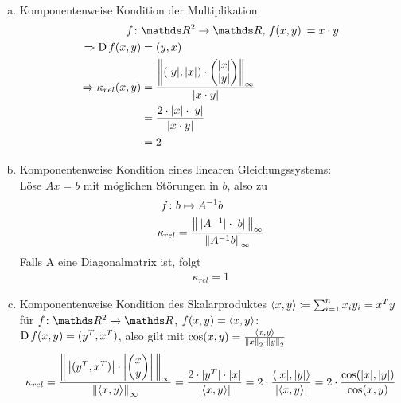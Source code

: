 \begin{Bspe}~
  \begin{enumerate}[a)]
  \item Komponentenweise Kondition der Multiplikation
    \begin{align*}
      f\colon &\R^2 \rightarrow \R, \, f(x,y) \coloneqq x\cdot y \\
      \Rightarrow \D f(x,y) &= (y, x)  \\
      \Rightarrow \kappa_{rel}(x,y) 
              &= \frac{\left\| (|y|, |x|)
                \cdot \begin{pmatrix}
                  |x| \\
                  |y|
                \end{pmatrix}\right\|_\infty}{|x\cdot y|} \\
              &= \frac{2\cdot|x|\cdot |y|}{|x\cdot y|} \\
              &= 2
    \end{align*}
  \item Komponentenweise Kondition eines linearen Gleichungssystems:\\
    Löse $Ax=b$ mit möglichen Störungen in $b$, also zu
    \begin{align*}
      f\colon & b\mapsto A^{-1}b \\
      \kappa_{rel} & = \frac{\nn[\,|A^{-1}|\cdot|b|\,]_\infty}{\nn[A^{-1}b]_\infty}
    \end{align*}
    Falls A eine Diagonalmatrix ist, folgt
    \begin{gather*}
      \kappa_{rel}=1
    \end{gather*}
  \item Komponentenweise Kondition des Skalarproduktes 
    $\scp{x}{y}\coloneqq \sum_{i=1}^{n}x_i y_i = x^Ty$ für
    $f\colon\R^2 \to \R$, $f(x,y) = \scp{x}{y}$:\\
    $\D f(x,y) = (y^T, x^T)$, also gilt mit
    $\cos(x,y) = \frac{\scp{x}{y}}{\nn[x]_2 \cdot \nn[y]_2}$
    \begin{gather*}
      \kappa_{rel}  
      = \frac{\nn[
        \,\left|(y^T, x^T)\right|
        \cdot\left|\begin{pmatrix}x\\y\end{pmatrix}\right|\,
      ]_\infty }
      {\nn[\langle x,y\rangle]_\infty}
      = \frac{2\cdot |y^T|\cdot |x|}{|\langle x,y\rangle|} 
      = 2\cdot \frac{\langle |x|,|y|\rangle}{|\langle x,y\rangle|} 
      = 2 \cdot \frac{\cos(|x|, |y|)}{\cos(x,y)}  
    \end{gather*}

\end{enumerate}
\end{Bspe}
